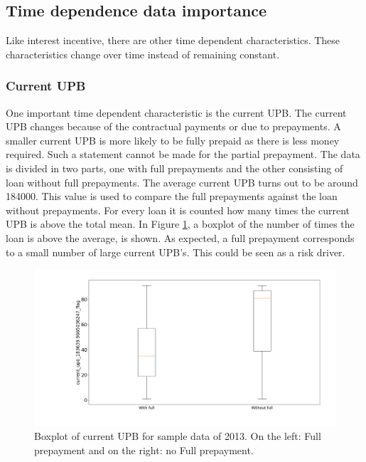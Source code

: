 \subsection{Time dependence data importance}
    Like interest incentive, there are other time
    dependent characteristics. These characteristics change over time instead of remaining constant.
    
    \subsubsection{Current UPB}
    One important time dependent
    characteristic is the current UPB. The current UPB changes
    because of the contractual payments or due to prepayments. 
    A smaller current UPB is more likely to be fully prepaid as
    there is less money required. Such a statement cannot be made
    for the partial prepayment. The data is divided in two parts,
    one with full prepayments and the other consisting of loan
    without full prepayments. The average current UPB turns out to
    be around 184000. This value is used to compare the full
    prepayments against the loan without prepayments. For every loan
    it is counted how many times the current UPB is above the total mean. In Figure \ref{Model_boxplot_current_upb_2013}, a boxplot of the number of times the loan is above the average, is shown. As expected, a full prepayment corresponds to a small number of large current UPB's. This could be seen as a risk driver. 
    
\begin{figure}[H]
    \centering
    \includegraphics[width=\linewidth]{Figures/current_upb_2013.png}
    \caption{Boxplot of current UPB for sample data of 2013.  On the left: Full prepayment and on the right: no Full prepayment.}
    \label{Model_boxplot_current_upb_2013}
\end{figure}
    
